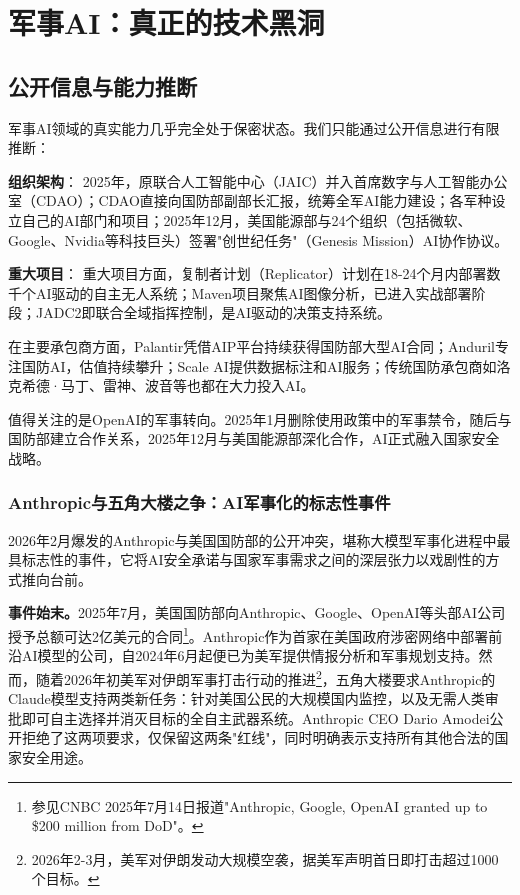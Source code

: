 \section{军事AI：真正的技术黑洞}

\subsection{公开信息与能力推断}

军事AI领域的真实能力几乎完全处于保密状态。我们只能通过公开信息进行有限推断：

    {\bfseries 组织架构}：
2025年，原联合人工智能中心（JAIC）并入首席数字与人工智能办公室（CDAO）；CDAO直接向国防部副部长汇报，统筹全军AI能力建设；各军种设立自己的AI部门和项目；2025年12月，美国能源部与24个组织（包括微软、Google、Nvidia等科技巨头）签署"创世纪任务"（Genesis Mission）AI协作协议。

    {\bfseries 重大项目}：
重大项目方面，复制者计划（Replicator）计划在18-24个月内部署数千个AI驱动的自主无人系统；Maven项目聚焦AI图像分析，已进入实战部署阶段；JADC2即联合全域指挥控制，是AI驱动的决策支持系统。

在主要承包商方面，Palantir凭借AIP平台持续获得国防部大型AI合同；Anduril专注国防AI，估值持续攀升；Scale AI提供数据标注和AI服务；传统国防承包商如洛克希德·马丁、雷神、波音等也都在大力投入AI。

值得关注的是OpenAI的军事转向。2025年1月删除使用政策中的军事禁令，随后与国防部建立合作关系，2025年12月与美国能源部深化合作，AI正式融入国家安全战略。

\subsubsection{Anthropic与五角大楼之争：AI军事化的标志性事件}

2026年2月爆发的Anthropic与美国国防部的公开冲突，堪称大模型军事化进程中最具标志性的事件，它将AI安全承诺与国家军事需求之间的深层张力以戏剧性的方式推向台前。

{\bfseries 事件始末。}2025年7月，美国国防部向Anthropic、Google、OpenAI等头部AI公司授予总额可达2亿美元的合同\footnote{参见CNBC 2025年7月14日报道"Anthropic, Google, OpenAI granted up to \$200 million from DoD"。}。Anthropic作为首家在美国政府涉密网络中部署前沿AI模型的公司，自2024年6月起便已为美军提供情报分析和军事规划支持。然而，随着2026年初美军对伊朗军事打击行动的推进\footnote{2026年2-3月，美军对伊朗发动大规模空袭，据美军声明首日即打击超过1000个目标。}，五角大楼要求Anthropic的Claude模型支持两类新任务：针对美国公民的大规模国内监控，以及无需人类审批即可自主选择并消灭目标的全自主武器系统。Anthropic CEO Dario Amodei公开拒绝了这两项要求，仅保留这两条"红线"，同时明确表示支持所有其他合法的国家安全用途。


